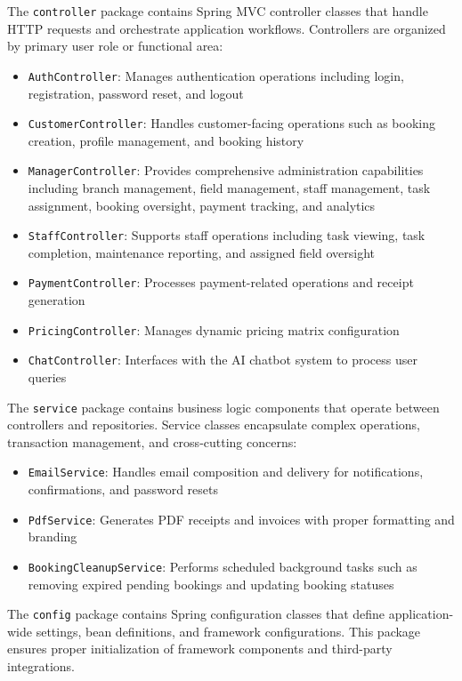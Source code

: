 The \texttt{controller} package contains Spring MVC controller classes that handle HTTP requests and orchestrate application workflows. Controllers are organized by primary user role or functional area:
\begin{itemize}
    \item \texttt{AuthController}: Manages authentication operations including login, registration, password reset, and logout
    \item \texttt{CustomerController}: Handles customer-facing operations such as booking creation, profile management, and booking history
    \item \texttt{ManagerController}: Provides comprehensive administration capabilities including branch management, field management, staff management, task assignment, booking oversight, payment tracking, and analytics
    \item \texttt{StaffController}: Supports staff operations including task viewing, task completion, maintenance reporting, and assigned field oversight
    \item \texttt{PaymentController}: Processes payment-related operations and receipt generation
    \item \texttt{PricingController}: Manages dynamic pricing matrix configuration
    \item \texttt{ChatController}: Interfaces with the AI chatbot system to process user queries
\end{itemize}

The \texttt{service} package contains business logic components that operate between controllers and repositories. Service classes encapsulate complex operations, transaction management, and cross-cutting concerns:
\begin{itemize}
    \item \texttt{EmailService}: Handles email composition and delivery for notifications, confirmations, and password resets
    \item \texttt{PdfService}: Generates PDF receipts and invoices with proper formatting and branding
    \item \texttt{BookingCleanupService}: Performs scheduled background tasks such as removing expired pending bookings and updating booking statuses
\end{itemize}

The \texttt{config} package contains Spring configuration classes that define application-wide settings, bean definitions, and framework configurations. This package ensures proper initialization of framework components and third-party integrations.

